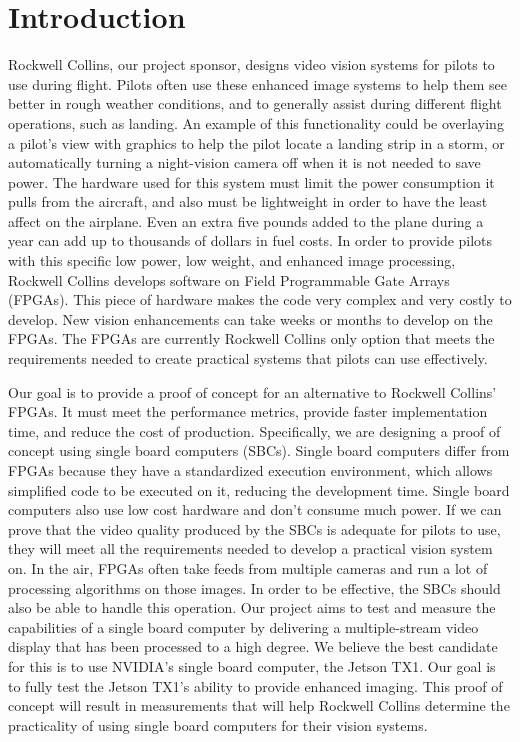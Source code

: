 \documentclass[letterpaper,10pt,titlepage]{IEEEtran}
\begin{document}
   \section{Introduction}
   Rockwell Collins, our project sponsor, designs video vision systems for pilots to use during flight. Pilots often use these enhanced image systems to help them see better in rough weather conditions, and to generally assist during different flight operations, such as landing. An example of this functionality could be overlaying a pilot's view with graphics to help the pilot locate a landing strip in a storm, or automatically turning a night-vision camera off when it is not needed to save power. The hardware used for this system must limit the power consumption it pulls from the aircraft, and also must be lightweight in order to have the least affect on the airplane. Even an extra five pounds added to the plane during a year can add up to thousands of dollars in fuel costs. In order to provide pilots with this specific low power, low weight, and enhanced image processing, Rockwell Collins develops software on Field Programmable Gate Arrays (FPGAs). This piece of hardware makes the code very complex and very costly to develop. New vision enhancements can take weeks or months to develop on the FPGAs. The FPGAs are currently Rockwell Collins only option that meets the requirements needed to create practical systems that pilots can use effectively.\\
\par
   Our goal is to provide a proof of concept for an alternative to Rockwell Collins' FPGAs. It must meet the performance metrics, provide faster implementation time, and reduce the cost of production. Specifically, we are designing a proof of concept using single board computers (SBCs). Single board computers differ from FPGAs because they have a standardized execution environment, which allows simplified code to be executed on it, reducing the development time. Single board computers also use low cost hardware and don't consume much power. If we can prove that the video quality produced by the SBCs is adequate for pilots to use, they will meet all the requirements needed to develop a practical vision system on. In the air, FPGAs often take feeds from multiple cameras and run a lot of processing algorithms on those images. In order to be effective, the SBCs should also be able to handle this operation. Our project aims to test and measure the capabilities of a single board computer by delivering a multiple-stream video display that has been processed to a high degree. We believe the best candidate for this is to use NVIDIA's single board computer, the Jetson TX1. Our goal is to fully test the Jetson TX1's ability to provide enhanced imaging. This proof of concept will result in measurements that will help Rockwell Collins determine the practicality of using single board computers for their vision systems.
   
\end{document}

